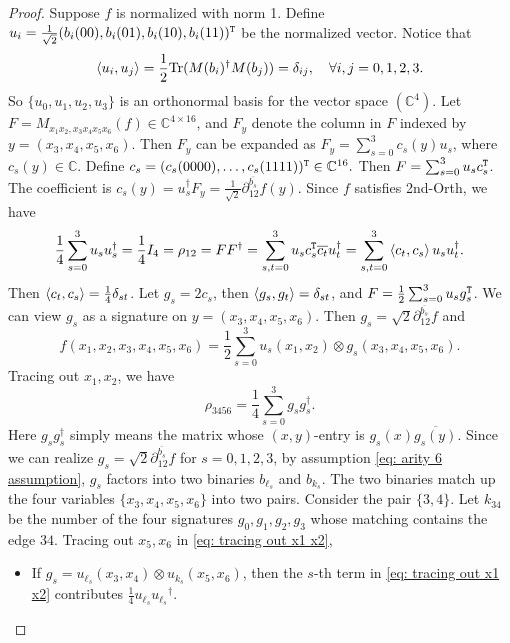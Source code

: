 \begin{proof}
    Suppose $f$ is normalized with norm 1.
    Define $u_i=\frac{1}{\sqrt{2}}({b_i}(00),b_i(01),b_i(10),b_i(11))^{\tt T}$ be the normalized vector.
    Notice that 
    $$\braket{u_i,u_j}=\frac{1}{2}\mathrm{Tr}(M(b_i)^\dagger M(b_j))=\delta_{ij},\quad  \forall i,j=0,1,2,3.$$ 
    So $\{u_0,u_1,u_2,u_3\}$ is an orthonormal basis for the vector space $ (\mathbb C^{4}).$
    Let $F=M_{x_1x_2,x_3x_4x_5x_6}(f)\in \mathbb{C}^{4\times 16}$, and $F_y$ denote the column in $F$ indexed by $y=(x_3,x_4,x_5,x_6).$ Then $F_y$ can be expanded as $F_y=\sum_{s=0}^3 c_s(y)u_s$, where $c_s(y)\in \mathbb{C}.$  
    Define $c_s=(c_s(0000),\ldots,c_s(1111))^{\tt T}\in \mathbb{C}^{16}.$
    Then $F=\sum_{s=0}^3 u_s c_s^{\tt T}$.
    The coefficient is $c_s(y)=u_s^\dagger F_y=\frac{1}{\sqrt{2}}\partial_{12}^{\overline{b_s}}f(y).$
    Since $f$ satisfies {\sc 2nd-Orth}, we have $$\frac{1}{4}\sum_{s=0}^3u_su_s^\dagger=\frac{1}{4}I_4=\rho_{12}=FF^\dagger=\sum_{s,t=0}^3u_sc_s^{\tt T}\overline{c_t}u_t^\dagger=\sum_{s,t=0}^3\braket{c_t,c_s}u_su_t^\dagger.$$
    Then $\braket{c_t,c_s}=\frac{1}{4}\delta_{st}$.
    Let $g_s=2c_s$, then $\braket{g_s,g_t}=\delta_{st}$, and $F=\frac{1}{2}\sum_{s=0}^3 u_sg_s^{\tt T}$.
    We can view $g_s$ as a signature on $y=(x_3,x_4,x_5,x_6).$
    Then $g_s=\sqrt{2}\partial_{12}^{\overline{b_s}}f$ and
    \begin{equation*}\label{eq: Schmidt decomposition of f}
        f(x_1,x_2,x_3,x_4,x_5,x_6)=\frac{1}{2}\sum_{s=0}^3 u_s(x_1,x_2)\otimes g_s(x_3,x_4,x_5,x_6).
    \end{equation*}
    Tracing out $x_1,x_2$, we have 
    \begin{equation}\label{eq: tracing out x1 x2}
        \rho_{3456}=\frac{1}{4}\sum_{s=0}^3g_sg_s^{\dagger}.
    \end{equation}
    Here \(g_sg_s^\dagger\) simply means the matrix whose \((x,y)\)-entry is \(g_s(x)\overline{g_s(y)}\).
    Since we can realize $g_s=\sqrt{2}\partial_{12}^{\overline{b_s}}f$ for $s=0,1,2,3$,
    by assumption \eqref{eq: arity 6 assumption}, $g_s$ factors into two binaries $b_{\ell_s}$ and $b_{k_s}.$
    The two binaries match up the four variables $\{x_3,x_4,x_5,x_6\}$ into two pairs.
    Consider the pair $\{3,4\}$.
    Let $k_{34}$ be the number of the four signatures \(g_0,g_1,g_2,g_3\) whose matching contains the edge \(34\).
    Tracing out $x_5,x_6$ in \eqref{eq: tracing out x1 x2},
    \begin{itemize}
        \item If $g_s=u_{\ell_s}(x_3,x_4)\otimes u_{k_s}(x_5,x_6)$, then the $s$-th term in \eqref{eq: tracing out x1 x2} contributes $\frac{1}{4}{u_{\ell_s}}{u_{\ell_s}}^\dagger.$
        

\end{itemize}
\end{proof}
